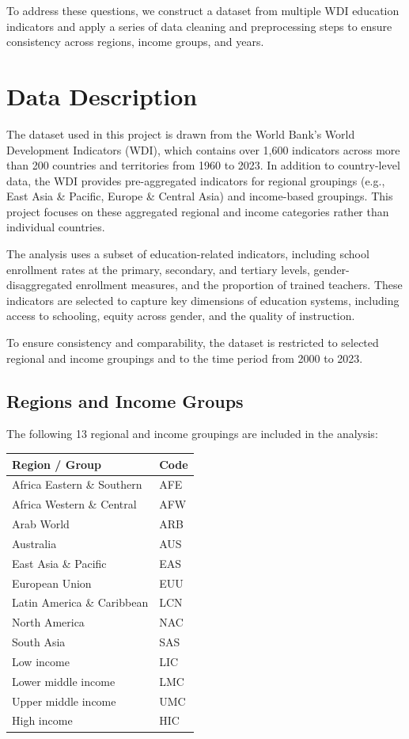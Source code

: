 \documentclass[
  11pt,
]{article}
\begin{document}
To address these questions, we construct a dataset from multiple WDI
education indicators and apply a series of data cleaning and
preprocessing steps to ensure consistency across regions, income groups,
and years.

\section{Data Description}\label{data-description}

The dataset used in this project is drawn from the World Bank's World
Development Indicators (WDI), which contains over 1,600 indicators
across more than 200 countries and territories from 1960 to 2023. In
addition to country-level data, the WDI provides pre-aggregated
indicators for regional groupings (e.g., East Asia \& Pacific, Europe \&
Central Asia) and income-based groupings. This project focuses on these
aggregated regional and income categories rather than individual
countries.

The analysis uses a subset of education-related indicators, including
school enrollment rates at the primary, secondary, and tertiary levels,
gender-disaggregated enrollment measures, and the proportion of trained
teachers. These indicators are selected to capture key dimensions of
education systems, including access to schooling, equity across gender,
and the quality of instruction.

To ensure consistency and comparability, the dataset is restricted to
selected regional and income groupings and to the time period from 2000
to 2023.

\subsection{Regions and Income Groups}\label{regions-and-income-groups}

The following 13 regional and income groupings are included in the
analysis:

\begin{longtable}[]{@{}ll@{}}
\toprule\noalign{}
Region / Group & Code \\
\midrule\noalign{}
\endhead
\bottomrule\noalign{}
\endlastfoot
Africa Eastern \& Southern & AFE \\
Africa Western \& Central & AFW \\
Arab World & ARB \\
Australia & AUS \\
East Asia \& Pacific & EAS \\
European Union & EUU \\
Latin America \& Caribbean & LCN \\
North America & NAC \\
South Asia & SAS \\
Low income & LIC \\
Lower middle income & LMC \\
Upper middle income & UMC \\
High income & HIC \\
\end{longtable}
\end{document}
